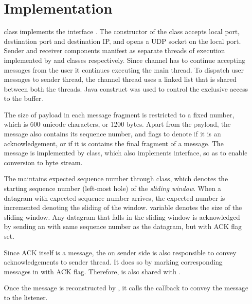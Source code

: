 \section{Implementation}
\label{sec:impl}

 class implements the interface .
The constructor of the class accepts local port, destination port and
destination IP, and opens a UDP socket on the local port. Sender and
receiver components manifest as separate threads of execution
implemented by  and  classes
respectively. Since channel has to continue accepting messages from
the user it continues executing the main thread. To dispatch
user messages to sender thread, the channel thread uses a
 linked list that is shared between both the threads.
Java construct  was used to control the exclusive
access to the buffer. 

The size of payload in each message fragment is restricted to a fixed
number, which is 600 unicode characters, or 1200 bytes. Apart from the
payload, the message also contains its sequence number, and flags to
denote if it is an acknowledgement, or if it is contains the final
fragment of a message. The message is implemented by 
class, which also implements  interface, so as to
enable conversion to byte stream. 

The  maintains expected sequence number through
 class, which denotes the starting sequence number
(left-most hole) of the \emph{sliding window}. When a datagram with
expected sequence number arrives, the expected number is incremented
denoting the sliding of the window. 
variable denotes the size of the sliding window. Any datagram that
falls in the sliding window is acknowledged by sending an
 with same sequence number as the datagram, but with
ACK flag set.

Since ACK itself is a message, the  on sender
side is also responsible to convey acknowledgements to sender thread.
It does so by marking corresponding messages in  with
ACK flag. Therefore,  is also shared with
.

Once the message is reconstructed by , it calls
the callback to convey the message to the listener.
